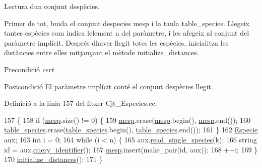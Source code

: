 Lectura d\textquotesingle{}un conjunt d\textquotesingle{}espècies. 

Primer de tot, buida el conjunt d\textquotesingle{}especies mesp i la taula table\+\_\+species. Llegeix tantes espècies com indica l\textquotesingle{}element n del paràmetre, i les afegeix al conjunt del paràmetre implícit. Després d\textquotesingle{}haver llegit totes les espècies, inicialitza les distàncies entre elles mitjançant el mètode initialize\+\_\+distances.

\begin{DoxyPrecond}{Precondició}
{\itshape cert} 
\end{DoxyPrecond}
\begin{DoxyPostcond}{Postcondició}
El paràmetre implícit conté el conjunt d\textquotesingle{}espècies llegit. 
\end{DoxyPostcond}


Definició a la línia 157 del fitxer Cjt\+\_\+\+Especies.\+cc.


\begin{DoxyCode}
157                                             \{
158     \textcolor{keywordflow}{if} (\hyperlink{class_cjt___especies_a64a525b38c78935e7432b362ea9a2306}{mesp}.size() != 0) \{
159         \hyperlink{class_cjt___especies_a64a525b38c78935e7432b362ea9a2306}{mesp}.erase(\hyperlink{class_cjt___especies_a64a525b38c78935e7432b362ea9a2306}{mesp}.begin(), \hyperlink{class_cjt___especies_a64a525b38c78935e7432b362ea9a2306}{mesp}.end());
160         \hyperlink{class_cjt___especies_ae56d242080836b8d3db505f0a8623090}{table\_species}.erase(\hyperlink{class_cjt___especies_ae56d242080836b8d3db505f0a8623090}{table\_species}.begin(), 
      \hyperlink{class_cjt___especies_ae56d242080836b8d3db505f0a8623090}{table\_species}.end());
161     \}
162     \hyperlink{class_especie}{Especie} aux;
163     \textcolor{keywordtype}{int} i = 0; 
164     \textcolor{keywordflow}{while} (i < n) \{
165         aux.\hyperlink{class_especie_a1a60c5306ae621527bb9183a5c64583f}{read\_single\_species}(k);
166         \textcolor{keywordtype}{string} \textcolor{keywordtype}{id} = aux.\hyperlink{class_especie_acfce0335ac5432dc681c2931b7986ace}{query\_identifier}();
167         \hyperlink{class_cjt___especies_a64a525b38c78935e7432b362ea9a2306}{mesp}.insert(make\_pair(\textcolor{keywordtype}{id}, aux));
168         ++i;
169     \}
170     \hyperlink{class_cjt___especies_ab041e83795b06d02ba7bad8422189361}{initialize\_distances}();
171 \}
\end{DoxyCode}
\mbox{\label{class_cjt___especies_a362d2295d52e2a4cb3618bda7ad3f65b}} 
